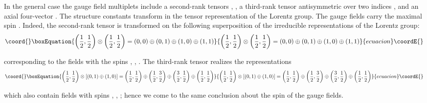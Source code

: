 \documentclass[a4paper,12pt]{article}
\begin{document}
In the general case the gauge field multiplets \coordHE{} include
a second-rank tensors \coordHE{}, \coordHE{}, a third-rank tensor antisymmetric over two indices \coordHE{}, and an axial four-vector \coordHE{}.
The structure constants \coordHE{} transform in the tensor
representation of the Lorentz group. The gauge fields carry the
maximal spin \coordHE{}. Indeed, the second-rank tensor \coordHE{}
is transformed on the following superposition of the irreducible
representations of the Lorentz group:
\begin{equation}\coord{}\boxEquation{
\left( \frac 12,\frac 12\right) \otimes \left( \frac 12,\frac
12\right) =\left( 0,0\right) \oplus \left( 0,1\right) \oplus
\left( 1,0\right) \oplus \left( 1,1\right)  \label{130}
}{
\left( \frac 12,\frac 12\right) \otimes \left( \frac 12,\frac
12\right) =\left( 0,0\right) \oplus \left( 0,1\right) \oplus
\left( 1,0\right) \oplus \left( 1,1\right)  }{ecuacion}\coordE{}\end{equation}

corresponding to the fields with the spins \coordHE{}, \coordHE{}, \coordHE{}. The third-rank
tensor \coordHE{} realizes the representations
\begin{equation}\coord{}\boxEquation{
\left( \frac 12,\frac 12\right) \otimes \left[ \left( 0,1\right)
\oplus \left( 1,0\right) \right] =\left( \frac 12,\frac 12\right)
\oplus \left( \frac 12,\frac 32\right) \oplus \left( \frac
32,\frac 12\right) \oplus \left( \frac 12,\frac 12\right)
\label{131}
}{
\left( \frac 12,\frac 12\right) \otimes \left[ \left( 0,1\right)
\oplus \left( 1,0\right) \right] =\left( \frac 12,\frac 12\right)
\oplus \left( \frac 12,\frac 32\right) \oplus \left( \frac
32,\frac 12\right) \oplus \left( \frac 12,\frac 12\right)
}{ecuacion}\coordE{}\end{equation}

which also contain fields with spins \coordHE{}, \coordHE{}, \coordHE{}; hence we come to the
same conclusion about the spin of the gauge fields.
\end{document}
